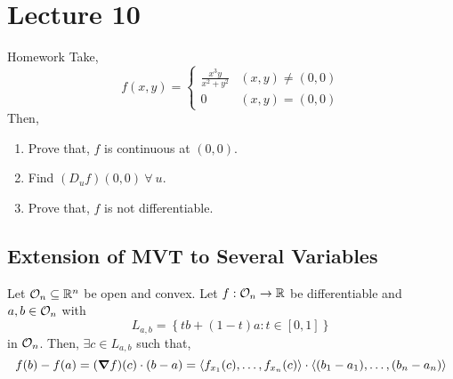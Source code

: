 \documentclass[../Analysis-3.tex]{subfiles}
\begin{document}
\chapter*{Lecture 10} %
\setcounter{chapter}{10} %


\begin{Eg}{Homework}{}
  Take, \[ f(x,y) = \begin{cases}
      \frac{x^{3}y}{x^2 + y^2} & (x,y) \neq (0,0) \\
      0                        & (x,y) = (0,0)
    \end{cases}\]
  Then,
  \begin{enumerate}
    \item Prove that, $f$ is continuous at $(0,0)$.
    \item Find $(D_{u}f)(0,0)\ \forall\ u$.
    \item Prove that, $f$ is not differentiable.
  \end{enumerate}
\end{Eg}

\section{Extension of MVT to Several Variables}

\begin{Thm}{}{}
  Let $ \mathcal{O}_{n} \subseteq \mathbb{R}^n $ be open and convex. Let $f : \mathcal{O}_{n} \to \mathbb{R}$ be differentiable and $a,b \in \mathcal{O}_{n}$ with \[L_{a,b} = \left\{ tb + (1-t)a : t \in [0,1]\right\} \] in $\mathcal{O}_{n}$. Then, $\exists c \in L_{a,b}$ such that, \[ f(b) - f(a) = (\grad f)(c)\cdot (b-a) = \left\langle f_{x_1}(c), \ldots, f_{x_n}(c) \right\rangle\cdot\left\langle (b_1 - a_1), \ldots, (b_n - a_n) \right\rangle  \]
\end{Thm}
\end{document}
